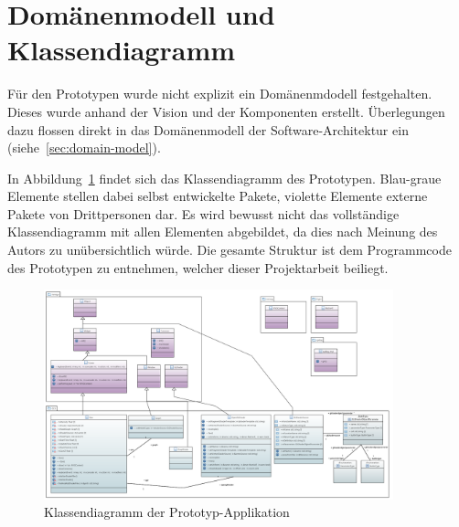 
\section{Domänenmodell und Klassendiagramm}
\label{sec:prototype:domain-model-class-diagram}

Für den Prototypen wurde nicht explizit ein Domänenmdodell festgehalten. Dieses
wurde anhand der Vision und der Komponenten erstellt. Überlegungen dazu flossen
direkt in das Domänenmodell der Software-Architektur ein
(siehe~\autoref{sec:domain-model}).

In Abbildung~\ref{fig:class-diagram:prototype} findet sich das Klassendiagramm
des Prototypen. Blau-graue Elemente stellen dabei selbst entwickelte Pakete,
violette Elemente externe Pakete von Drittpersonen dar. Es wird bewusst
nicht das vollständige Klassendiagramm mit allen Elementen abgebildet, da dies
nach Meinung des Autors zu unübersichtlich würde. Die gesamte Struktur ist dem
Programmcode des Prototypen zu entnehmen, welcher dieser Projektarbeit
beiliegt.

\begin{figure}[H]
    \centering
    \includegraphics[angle=90,width=0.9\textwidth]{img/prototype_class_diagram.png}
    \caption{Klassendiagramm der Prototyp-Applikation}\label{fig:class-diagram:prototype}
\end{figure}

